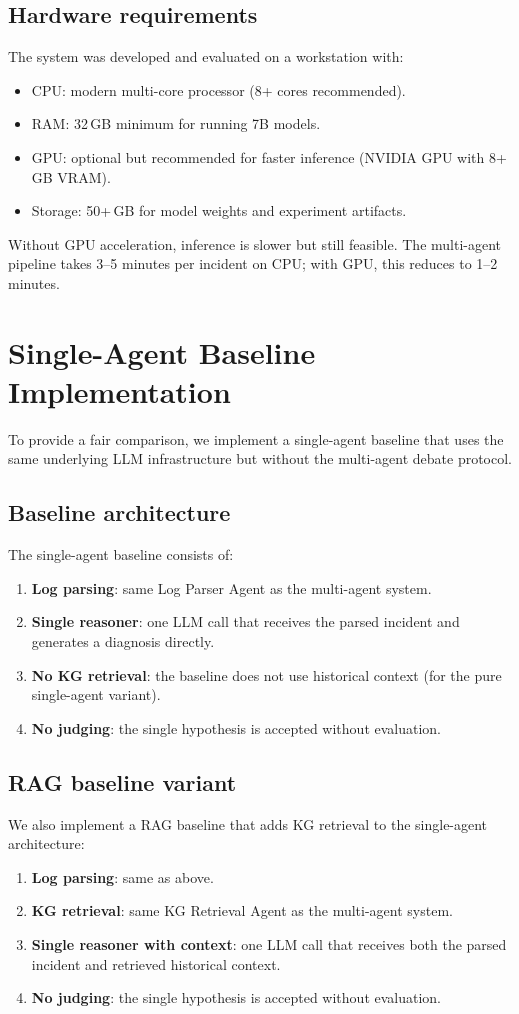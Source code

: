 \subsection{Hardware requirements}
The system was developed and evaluated on a workstation with:
\begin{itemize}
  \item CPU: modern multi-core processor (8+ cores recommended).
  \item RAM: 32\,GB minimum for running 7B models.
  \item GPU: optional but recommended for faster inference (NVIDIA GPU with 8+\,GB VRAM).
  \item Storage: 50+\,GB for model weights and experiment artifacts.
\end{itemize}

Without GPU acceleration, inference is slower but still feasible. The multi-agent pipeline takes
3--5 minutes per incident on CPU; with GPU, this reduces to 1--2 minutes.

\section{Single-Agent Baseline Implementation}
To provide a fair comparison, we implement a single-agent baseline that uses the same underlying
LLM infrastructure but without the multi-agent debate protocol.

\subsection{Baseline architecture}
The single-agent baseline consists of:
\begin{enumerate}
  \item \textbf{Log parsing}: same Log Parser Agent as the multi-agent system.
  \item \textbf{Single reasoner}: one LLM call that receives the parsed incident and generates a
        diagnosis directly.
  \item \textbf{No KG retrieval}: the baseline does not use historical context (for the pure
        single-agent variant).
  \item \textbf{No judging}: the single hypothesis is accepted without evaluation.
\end{enumerate}

\subsection{RAG baseline variant}
We also implement a RAG baseline that adds KG retrieval to the single-agent architecture:
\begin{enumerate}
  \item \textbf{Log parsing}: same as above.
  \item \textbf{KG retrieval}: same KG Retrieval Agent as the multi-agent system.
  \item \textbf{Single reasoner with context}: one LLM call that receives both the parsed incident
        and retrieved historical context.
  \item \textbf{No judging}: the single hypothesis is accepted without evaluation.
\end{enumerate}

